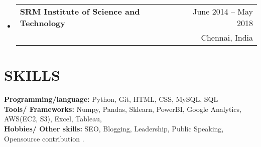 \documentclass[letterpaper,11pt]{article}
\makeatletter
\newcommand{\resumeItem}[1]{
  \item\small{
    {#1 \vspace{-1pt}}
  }
}
\newcommand{\resumeSubheading}[4]{
  \vspace{-1pt}\item
    \begin{tabular*}{\textwidth}[t]{l@{\extracolsep{\fill}}r}
      \textbf{#1} & {\color{dark-grey}\small #2}\vspace{1pt}\\ %
      \text{#3} & {\color{dark-grey} \small #4}\\ %
    \end{tabular*}\vspace{-4pt}
}
\newcommand{\resumeSubHeadingListStart}{\begin{itemize}[leftmargin=0in, label={}]}
\newcommand{\resumeSubHeadingListEnd}{\end{itemize}}
\newcommand{\resumeItemListStart}{\begin{itemize}}
\newcommand{\resumeItemListEnd}{\end{itemize}\vspace{0pt}}
\makeatother
\begin{document}
  
  \resumeSubHeadingListStart
    \resumeSubheading
      {SRM Institute of Science and Technology}{June 2014 -- May 2018}
      {Bachelor in Technology(B.Tech) - Computer Science - CGPA 7.8/10}{Chennai, India}

  \resumeSubHeadingListEnd

%

\section{SKILLS}
 \begin{itemize}[leftmargin=0in, label={}]
    \small{\item{
     \textbf{Programming/language:} { Python, Git, HTML, CSS, MySQL, SQL}\vspace{2pt} \\
     \textbf{Tools/ Frameworks:} {   Numpy, Pandas, Sklearn, PowerBI, Google Analytics, AWS(EC2, S3), Excel, Tableau,  } \\
     \textbf{Hobbies/ Other skills:} {SEO, Blogging, Leadership, Public Speaking, Opensource contribution .}\
     
    }}
 \end{itemize}




  
\end{document}
